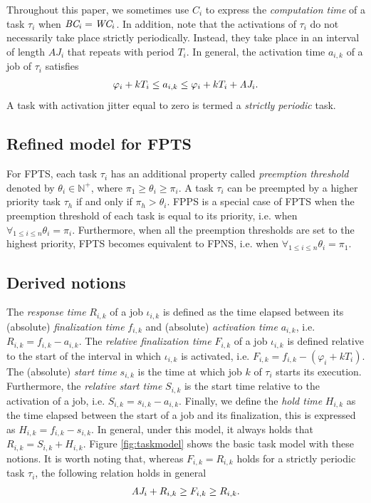 Throughout this paper, we sometimes use $C_i$ to express the \textit{computation time} of a task $\tau_i$ when $\mbox{\it BC}_i=\mbox{\it WC}_i$. In addition, note that the activations of $\tau_i$ do not necessarily take place strictly periodically. Instead, they take place in an interval of length $AJ_i$ that repeats with period $T_i$. In general, the activation time $a_{i,k}$ of a job of $\tau_i$ satisfies
\begin{align}
\varphi_i + kT_i \leq a_{i,k} \leq 	\varphi_i + kT_i + \mbox{\it AJ}_i.
\end{align}
A task with activation jitter equal to zero is termed a \textit{strictly periodic} task.

\subsection{Refined model for FPTS}
For FPTS, each task $\tau_i$ has an additional property called \textit{preemption threshold} denoted by $\theta_i \in \mathbb{N^+}$, where $\pi_1 \geq \theta_i \geq \pi_i$. A task $\tau_i$ can be preempted by a higher priority task $\tau_h$ if and only if $\pi_h > \theta_i$. FPPS is a special case of FPTS when the preemption threshold of each task is equal to its priority, i.e. when $\forall_{1\leq i \leq n}\theta_i = \pi_i$. Furthermore, when all the preemption thresholds are set to the highest priority, FPTS becomes equivalent to FPNS, i.e. when $\forall_{1\leq i \leq n}\theta_i = \pi_1$.

\subsection{Derived notions}

The \textit{response time} $R_{i,k}$ of a job $\iota_{i,k}$ is defined as the time elapsed between its (absolute) \textit{finalization time} $f_{i,k}$ and (absolute) \textit{activation time} $a_{i,k}$, i.e. $R_{i,k}=f_{i,k}-a_{i,k}$. The \textit{relative finalization time} $F_{i,k}$ of a job $\iota_{i,k}$ is defined relative to the start of
the interval in which $\iota_{i,k}$ is activated, i.e. $F_{i,k}=f_{i,k}-(\varphi_i+kT_i)$. The (absolute) \textit{start time} $s_{i,k}$ is the time at which job $k$ of $\tau_i$ starts its execution. Furthermore, the \textit{relative start time} $S_{i,k}$ is the start time relative to the activation of a job, i.e. $S_{i,k}=s_{i,k}-a_{i,k}$. Finally, we define the \textit{hold time} $H_{i,k}$ as the time elapsed between the start of a job and its finalization, this is expressed as $H_{i,k}=f_{i,k}-s_{i,k}$. In general, under this model, it always holds that $R_{i,k}=S_{i,k}+H_{i,k}$. Figure \ref{fig:taskmodel} shows the basic task model with these notions. It is worth noting that, whereas $F_{i,k} = R_{i,k}$ holds for a strictly periodic task $\tau_i$, the following relation holds in general
\begin{align}
	\mbox{\it AJ}_i + R_{i,k} \geq F_{i,k} \geq R_{i,k}.
\end{align}

